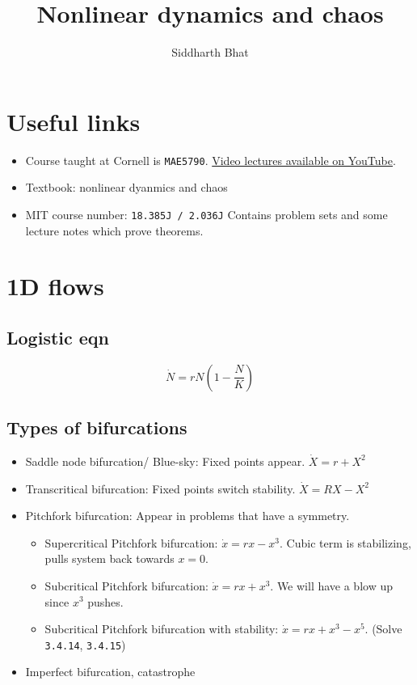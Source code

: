 \documentclass[11pt]{book}
\title{Nonlinear dynamics and chaos}
\author{Siddharth Bhat}
\date{}
\begin{document}
\maketitle
\tableofcontents

\chapter{Useful links}
\begin{itemize}
    \item Course taught at Cornell is \texttt{MAE5790}. 
\href{https://www.youtube.com/watch?v=ycJEoqmQvwg&list=PLbN57C5Zdl6j_qJA-pARJnKsmROzPnO9V}{Video lectures available on YouTube}.
\item Textbook: nonlinear dyanmics and chaos
\item MIT course number: \texttt{18.385J / 2.036J} Contains problem sets and some lecture notes
    which prove theorems.
\end{itemize}



\chapter{1D flows}

\section{Logistic eqn}

$$ \dot N = rN(1- \frac{N}{K}) $$

\section{Types of bifurcations}
\begin{itemize}
    \item Saddle node bifurcation/ Blue-sky: Fixed points appear. $ \dot X = r + X^2$
    \item Transcritical bifurcation: Fixed points switch stability. $\dot X = RX - X^2$
    \item Pitchfork bifurcation: Appear in problems that have a symmetry.
        \begin{itemize}
            \item Supercritical Pitchfork bifurcation: $\dot x = rx - x^3$.
                Cubic  term is stabilizing, pulls system back towards $x = 0$.
            \item Subcritical Pitchfork bifurcation: $\dot x = rx + x^3$.
                We will have a blow up since $x^3$ pushes.

            \item Subcritical Pitchfork bifurcation with stability: 
                $\dot x = rx + x^3 - x^5$. (Solve \texttt{3.4.14}, \texttt{3.4.15})
        \end{itemize}
    \item Imperfect bifurcation, catastrophe
\end{itemize}
\end{document}
